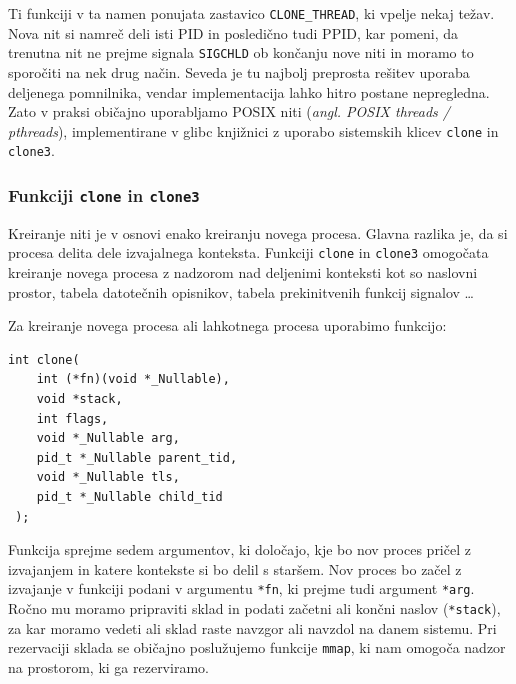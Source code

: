 \documentclass[a4paper,12pt,openright]{book}
\begin{document}
Ti funkciji v ta namen ponujata zastavico \texttt{CLONE\_THREAD}, ki vpelje nekaj težav.
Nova nit si namreč deli isti PID in posledično tudi PPID, kar pomeni, da trenutna nit ne prejme signala \texttt{SIGCHLD} ob končanju nove niti in moramo to sporočiti na nek drug način.
Seveda je tu najbolj preprosta rešitev uporaba deljenega pomnilnika, vendar implementacija lahko hitro postane nepregledna.
Zato v praksi običajno uporabljamo POSIX niti (\textit{angl. POSIX threads / pthreads}), implementirane v glibc knjižnici z uporabo sistemskih klicev \texttt{clone} in \texttt{clone3}.

\subsubsection{Funkciji \texttt{clone} in \texttt{clone3}}

Kreiranje niti je v osnovi enako kreiranju novega procesa.
Glavna razlika je, da si procesa delita dele izvajalnega konteksta.
Funkciji \texttt{clone} in \texttt{clone3} omogočata kreiranje novega procesa z nadzorom nad deljenimi konteksti kot so naslovni prostor, tabela datotečnih opisnikov, tabela prekinitvenih funkcij signalov \dots

Za kreiranje novega procesa ali lahkotnega procesa uporabimo funkcijo:
\begin{lstlisting}[style=func]
 int clone(
	int (*fn)(void *_Nullable),
	void *stack,
	int flags,
	void *_Nullable arg,
	pid_t *_Nullable parent_tid,
	void *_Nullable tls,
	pid_t *_Nullable child_tid
 );
\end{lstlisting}

Funkcija sprejme sedem argumentov, ki določajo, kje bo nov proces pričel z izvajanjem in katere kontekste si bo delil s staršem.
Nov proces bo začel z izvajanje v funkciji podani v argumentu \texttt{*fn}, ki prejme tudi argument \texttt{*arg}.
Ročno mu moramo pripraviti sklad in podati začetni ali končni naslov (\texttt{*stack}), za kar moramo vedeti ali sklad raste navzgor ali navzdol na danem sistemu.
Pri rezervaciji sklada se običajno poslužujemo funkcije \texttt{mmap}, ki nam omogoča nadzor na prostorom, ki ga rezerviramo.
\end{document}

